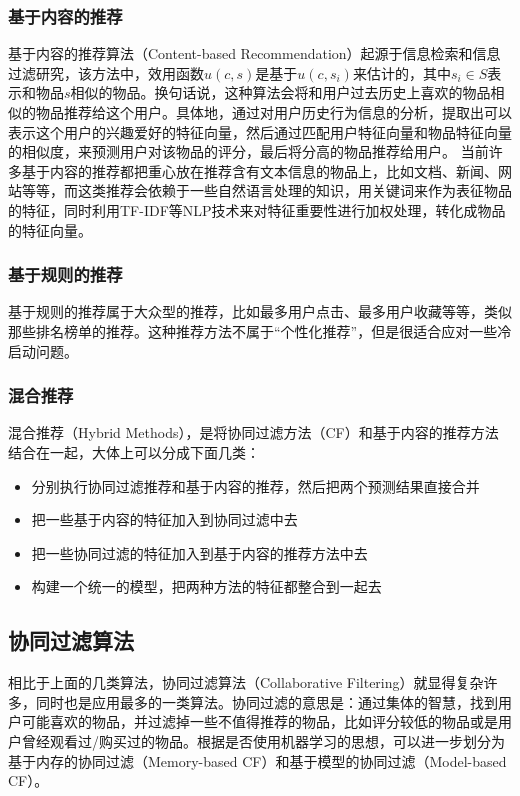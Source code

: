 \documentclass{article}
\begin{document}
		\subsubsection{基于内容的推荐}
		基于内容的推荐算法（Content-based Recommendation）起源于信息检索和信息过滤研究，该方法中，效用函数$u(c,s)$是基于$u(c,s_i)$来估计的，其中$s_i\in S$表示和物品$s$相似的物品。换句话说，这种算法会将和用户过去历史上喜欢的物品相似的物品推荐给这个用户。具体地，通过对用户历史行为信息的分析，提取出可以表示这个用户的兴趣爱好的特征向量，然后通过匹配用户特征向量和物品特征向量的相似度，来预测用户对该物品的评分，最后将分高的物品推荐给用户。
		当前许多基于内容的推荐都把重心放在推荐含有文本信息的物品上，比如文档、新闻、网站等等，而这类推荐会依赖于一些自然语言处理的知识，用关键词来作为表征物品的特征，同时利用TF-IDF等NLP技术来对特征重要性进行加权处理，转化成物品的特征向量。
		\subsubsection{基于规则的推荐}
		基于规则的推荐属于大众型的推荐，比如最多用户点击、最多用户收藏等等，类似那些排名榜单的推荐。这种推荐方法不属于“个性化推荐”，但是很适合应对一些冷启动问题。
		\subsubsection{混合推荐}
		混合推荐（Hybrid Methods），是将协同过滤方法（CF）和基于内容的推荐方法结合在一起，大体上可以分成下面几类：
		\begin{itemize}
		\item 分别执行协同过滤推荐和基于内容的推荐，然后把两个预测结果直接合并
		\item 把一些基于内容的特征加入到协同过滤中去
		\item 把一些协同过滤的特征加入到基于内容的推荐方法中去
		\item 构建一个统一的模型，把两种方法的特征都整合到一起去
		\end{itemize}
	\subsection{协同过滤算法}
	相比于上面的几类算法，协同过滤算法（Collaborative Filtering）就显得复杂许多，同时也是应用最多的一类算法。协同过滤的意思是：通过集体的智慧，找到用户可能喜欢的物品，并过滤掉一些不值得推荐的物品，比如评分较低的物品或是用户曾经观看过/购买过的物品。根据是否使用机器学习的思想，可以进一步划分为基于内存的协同过滤（Memory-based CF）和基于模型的协同过滤（Model-based CF）。
\end{document}
